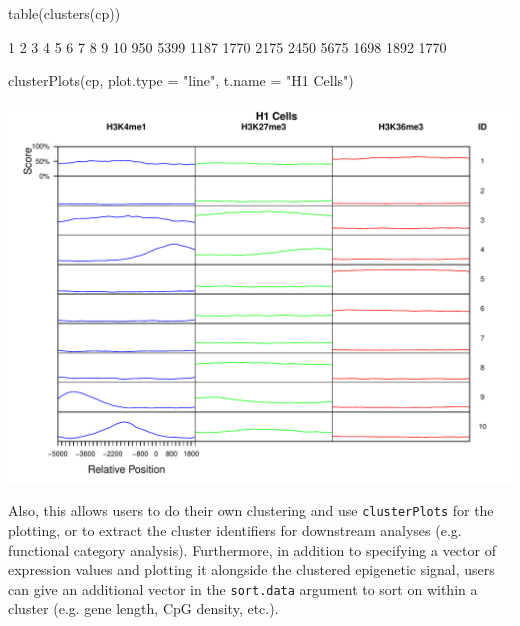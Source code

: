 \begin{Schunk}
\begin{Sinput}
 table(clusters(cp))
\end{Sinput}
\begin{Soutput}
   1    2    3    4    5    6    7    8    9   10 
 950 5399 1187 1770 2175 2450 5675 1698 1892 1770 
\end{Soutput}
\begin{Sinput}
 clusterPlots(cp, plot.type = "line", t.name = "H1 Cells")
\end{Sinput}
\end{Schunk}
\includegraphics{visualisations-cluPlots3}

Also, this allows users to do their own clustering and use \texttt{clusterPlots} for the plotting, or to extract the cluster identifiers for downstream analyses (e.g. functional category analysis).  Furthermore, in addition to specifying a vector of expression values and plotting it alongside the clustered epigenetic signal, users can give an additional vector in the \texttt{sort.data} argument to sort on within a cluster (e.g. gene length, CpG density, etc.).

